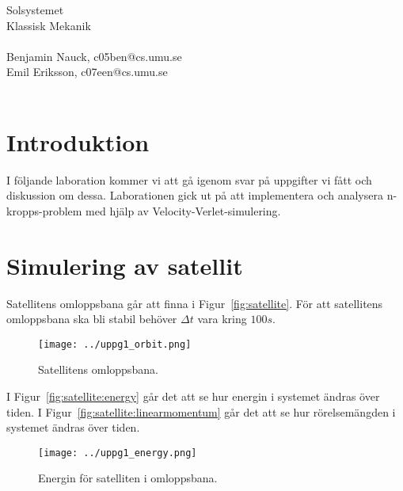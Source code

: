 \documentclass[a4]{article}
\begin{document}
{
\Large
Solsystemet\\
Klassisk Mekanik\\
~\\
Benjamin Nauck, c05ben@cs.umu.se\\
Emil Eriksson, c07een@cs.umu.se\\
~\\
}
\clearpage

\section{Introduktion}
I följande laboration kommer vi att gå igenom svar på uppgifter vi fått och
diskussion om dessa.
Laborationen gick ut på att implementera och analysera n-kropps-problem med
hjälp av Velocity-Verlet-simulering.

\section{Simulering av satellit}
Satellitens omloppsbana går att finna i Figur~\vref{fig:satellite}.
För att satellitens omloppsbana ska bli stabil behöver $\Delta t$ vara kring
$100s$.
\begin{figure}
\begin{center}
	\texttt{[image: ../uppg1\_orbit.png]}
\end{center}
\caption{Satellitens omloppsbana.}
\label{fig:satellite}
\end{figure}


I Figur~\vref{fig:satellite:energy} går det att se hur energin i systemet ändras
över tiden.
I Figur~\vref{fig:satellite:linearmomentum} går det att se hur rörelsemängden i
systemet ändras över tiden.

\begin{figure}
\begin{center}
	\texttt{[image: ../uppg1\_energy.png]}
\end{center}
\caption{Energin för satelliten i omloppsbana.}
\label{fig:satellite:energy}
\end{figure}
\end{document}
